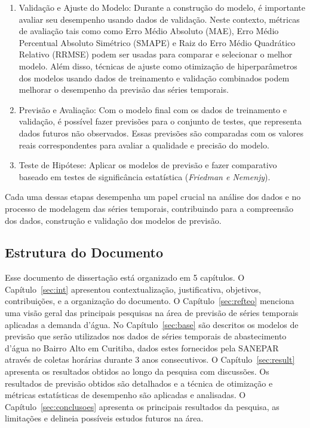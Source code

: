 \begin{enumerate}
	\item {Validação e Ajuste do Modelo}: Durante a construção do modelo, é importante avaliar seu desempenho usando dados de validação. Neste contexto, métricas de avaliação tais como como Erro Médio Absoluto (MAE), Erro Médio Percentual Absoluto Simétrico (SMAPE) e Raiz do Erro Médio Quadrático Relativo (RRMSE) podem ser usadas para comparar e selecionar o melhor modelo. Além disso, técnicas de ajuste como otimização de hiperparâmetros dos modelos usando dados de treinamento e validação combinados podem melhorar o desempenho da previsão das séries temporais.
	
	\item {Previsão e Avaliação}: Com o modelo final com os dados de treinamento e validação, é possível fazer previsões para o conjunto de testes, que representa dados futuros não observados. Essas previsões são comparadas com os valores reais correspondentes para avaliar a qualidade e precisão do modelo.
	
	\item {Teste de Hipótese}: Aplicar os modelos de previsão e fazer comparativo baseado em testes de significância estatística (\textit{Friedman e Nemenjy}).
	
	
	
\end{enumerate}

Cada uma dessas etapas desempenha um papel crucial na análise dos dados e no processo de modelagem das séries temporais, contribuindo para a compreensão dos dados, construção e validação dos modelos de previsão.

\subsection{Estrutura do Documento} \label{subsec:estrutura}

Esse documento de dissertação está organizado em 5 capítulos. O Capítulo~\ref{sec:int}  apresentou contextualização, justificativa, objetivos, contribuições, e a organização do documento.  O Capítulo~\ref{sec:refteo} menciona uma visão geral das principais pesquisas na área de previsão de séries temporais aplicadas a demanda d'água. No Capítulo~\ref{sec:base} são descritos os modelos de previsão que serão utilizados nos dados de séries temporais de abastecimento d'água no Bairro Alto em Curitiba, dados estes fornecidos pela SANEPAR através de coletas horárias durante 3 anos consecutivos. O Capítulo~\ref{sec:result} apresenta os resultados obtidos ao longo da pesquisa com discussões. Os resultados de previsão obtidos são detalhados e a técnica de otimização e métricas estatísticas de desempenho são aplicadas e analisadas. O Capítulo~\ref{sec:conclusoes} apresenta os principais resultados da pesquisa, as limitações e delineia possíveis estudos futuros na área. 
